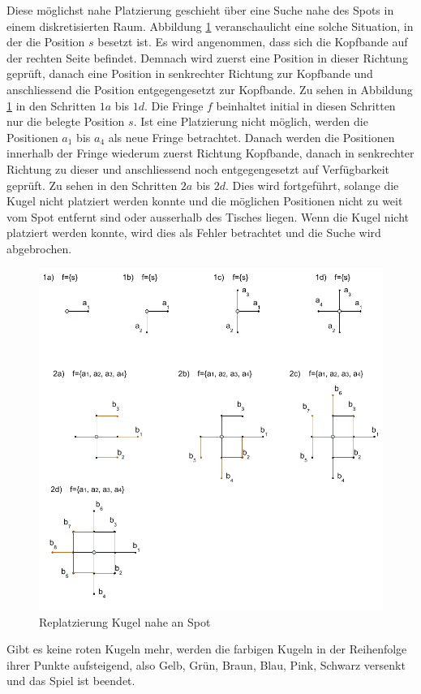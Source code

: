 Diese möglichst nahe Platzierung geschieht über eine Suche nahe des Spots in einem diskretisierten Raum.
Abbildung \ref{fig:snooker_spot_replacement} veranschaulicht eine solche Situation, in der die Position $s$ besetzt
ist. Es wird angenommen, dass sich die Kopfbande auf der rechten Seite befindet. Demnach wird zuerst eine Position in dieser
Richtung geprüft, danach eine Position in senkrechter Richtung zur Kopfbande und anschliessend die Position entgegengesetzt
zur Kopfbande. Zu sehen in Abbildung \ref{fig:snooker_spot_replacement} in den Schritten $1a$ bis $1d$. Die Fringe $f$ beinhaltet
initial in diesen Schritten nur die belegte Position $s$.
Ist eine Platzierung nicht möglich, werden die Positionen $a_1$ bis $a_4$ als neue Fringe betrachtet. Danach werden die Positionen
innerhalb der Fringe wiederum zuerst Richtung Kopfbande, danach in senkrechter Richtung zu dieser und anschliessend noch entgegengesetzt
auf Verfügbarkeit geprüft. Zu sehen in den Schritten $2a$ bis $2d$. Dies wird fortgeführt, solange die Kugel nicht platziert
werden konnte und die möglichen Positionen nicht zu weit vom Spot entfernt sind oder ausserhalb des Tisches liegen.
Wenn die Kugel nicht platziert werden konnte, wird dies als Fehler betrachtet und die Suche wird abgebrochen.

\begin{figure}[h!]
    \begin{center}
        \includegraphics[width=0.6\linewidth]{../common/03_billiard_ai/resources/40_replatzierung_kugel.png}
    \end{center}
    \caption{Replatzierung Kugel nahe an Spot}
    \label{fig:snooker_spot_replacement}
\end{figure}

Gibt es keine roten Kugeln mehr, werden die farbigen Kugeln in der Reihenfolge ihrer Punkte aufsteigend,
also Gelb, Grün, Braun, Blau, Pink, Schwarz versenkt und das Spiel ist beendet\cite{stoppball:spielregel:snooker}.
